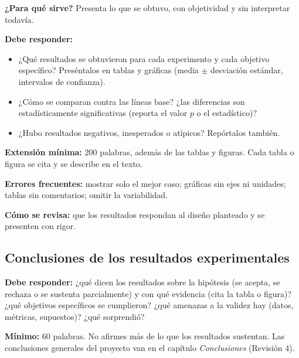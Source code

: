 \begin{guia}
\textbf{¿Para qué sirve?} Presenta lo que se obtuvo, con objetividad y sin interpretar todavía.

\textbf{Debe responder:}
\begin{itemize}[nosep,leftmargin=*]
  \item ¿Qué resultados se obtuvieron para cada experimento y cada objetivo específico? Preséntalos en tablas y gráficas
        (media $\pm$ desviación estándar, intervalos de confianza).
  \item ¿Cómo se comparan contra las líneas base? ¿las diferencias son estadísticamente significativas (reporta el
        valor $p$ o el estadístico)?
  \item ¿Hubo resultados negativos, inesperados o atípicos? Repórtalos también.
\end{itemize}

\textbf{Extensión mínima:} 200 palabras, además de las tablas y figuras. Cada tabla o figura se cita y se describe en
el texto.

\textbf{Errores frecuentes:} mostrar solo el mejor caso; gráficas sin ejes ni unidades; tablas sin comentarios; omitir la
variabilidad.

\textbf{Cómo se revisa:} que los resultados respondan al diseño planteado y se presenten con rigor.
\end{guia}

\subsection{Conclusiones de los resultados experimentales} \label{sec:conclusiones_resultados} %

\begin{guia}
\textbf{Debe responder:} ¿qué dicen los resultados sobre la hipótesis (se acepta, se rechaza o se sustenta parcialmente) y
con qué evidencia (cita la tabla o figura)? ¿qué objetivos específicos se cumplieron? ¿qué amenazas a la validez hay
(datos, métricas, supuestos)? ¿qué sorprendió?

\textbf{Mínimo:} 60 palabras. No afirmes más de lo que los resultados sustentan. Las conclusiones generales del proyecto
van en el capítulo \emph{Conclusiones} (Revisión 4).
\end{guia}

